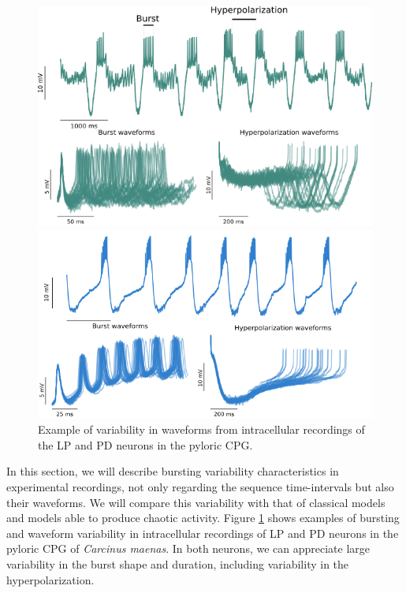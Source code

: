 \begin{figure}[hbt]
	\centering
	\begin{minipage}{0.48\textwidth}
		\includegraphics[width=\textwidth]{img/invariants/variability/lp_burst_variability.png}
	\end{minipage}
	\begin{minipage}{0.48\textwidth}
		\includegraphics[width=\textwidth]{img/invariants/variability/pd_burst_variability.png}
	\end{minipage}
	\caption{Example of variability in waveforms from intracellular recordings of the LP and PD neurons in the pyloric CPG.}
	\label{fig:lp-pd burst variability}
\end{figure}

In this section, we will describe bursting variability characteristics in experimental recordings, not only regarding the sequence time-intervals but also their waveforms. We will compare this variability with that of classical models and models able to produce chaotic activity. 
Figure \ref{fig:lp-pd burst variability} shows examples of  bursting and waveform variability in  intracellular recordings of LP and PD neurons in the pyloric CPG of \textit{Carcinus maenas}. In both neurons, we can appreciate large variability in the burst shape and duration, including variability in the hyperpolarization.


